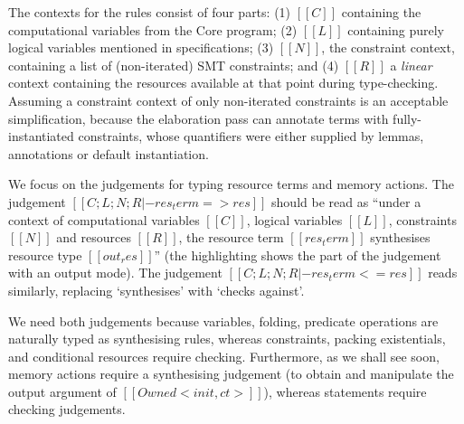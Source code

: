 \documentclass[11pt]{article}%
\begin{document}
The contexts for the rules consist of four parts: (1) $[[ C ]]$ containing the
computational variables from the Core program; (2) $[[ L ]]$ containing purely
logical variables mentioned in specifications; (3) $[[ N ]]$, the constraint
context, containing a list of (non-iterated) SMT constraints; and (4) $[[ R ]]$ a
\emph{linear} context containing the resources available at that point during
type-checking. Assuming a constraint context of only non-iterated constraints
is an acceptable simplification, because the elaboration pass can annotate terms
with fully-instantiated constraints, whose quantifiers were either supplied
by lemmas, annotations or default instantiation.

We focus on the judgements for typing resource terms and memory actions. The
judgement $[[ C ; L ; N ; R |- res_term => res ]]$ should be read as ``under a
context of computational variables $[[ C ]]$, logical variables $[[ L ]]$,
constraints $[[ N ]]$ and resources $[[ R ]]$, the resource term
$[[ res_term ]]$ synthesises resource type $[[ out_res ]]$'' (the highlighting shows the
part of the judgement with an \colorbox{red!10}{output mode}). The judgement
$[[ C ; L ; N ; R |- res_term <= res ]]$ reads similarly, replacing
`synthesises' with `checks against'.

We need both judgements because variables, folding, predicate operations are
naturally typed as synthesising rules, whereas constraints, packing
existentials, and conditional resources require checking.  Furthermore, as we
shall see soon, memory actions require a synthesising judgement (to obtain and
manipulate the output argument of $[[ Owned < init , ct > ]]$), whereas
statements require checking judgements.

\begin{figure}[t]
\small
\centering
\begingroup
\NewCommandCopy{\origcndrule}{\cndrule}
\renewcommand{\cndrule}[4][]{\origcndrule[#1]{#2}{%
\begin{minipage}{0.8\textwidth}
    \raggedright
    \leftskip 2em
    \parindent -2em
    $#3$
\end{minipage}
}{#4}}%
\begin{minipage}{.4\textwidth}
\vspace{-2\baselineskip}
\cndruleResXXChkXXIfXXTrue{}%
\\[-1\baselineskip]
\\[-1\baselineskip]
\vspace{-2\baselineskip}
\end{minipage}
\begin{minipage}{.5\textwidth}
\vspace{-2\baselineskip}
\\[-1\baselineskip]
\\[-1\baselineskip]
\vspace{-2\baselineskip}
\end{minipage}
\endgroup
\end{figure}
\end{document}
